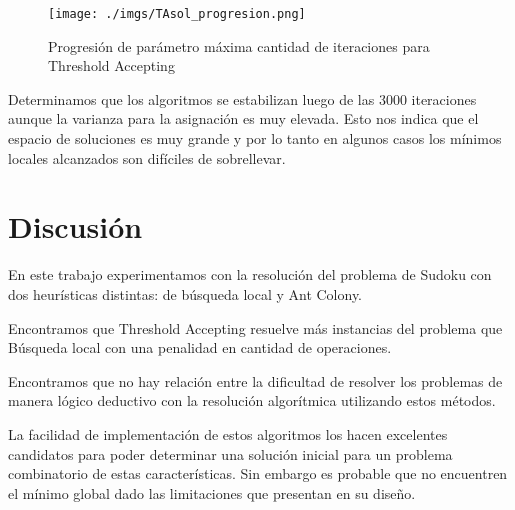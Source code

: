 \documentclass[a4paper,spanish]{article}
\begin{document}
\begin{center}
    \begin{figure}[H]
        \texttt{[image: ./imgs/TAsol\_progresion.png]}
        \caption{Progresión de parámetro máxima cantidad de iteraciones para
        Threshold Accepting}
        \label{img:prog_ta}
    \end{figure}
\end{center}

Determinamos que los algoritmos se estabilizan luego de las 3000 iteraciones
aunque la varianza para la asignación es muy elevada. Esto nos indica que el
espacio de soluciones es muy grande y por lo tanto en algunos casos los mínimos locales
alcanzados son difíciles de sobrellevar.



\section{Discusión}

En este trabajo experimentamos con la resolución del problema de Sudoku con dos
heurísticas distintas: de búsqueda local y Ant Colony.

Encontramos que Threshold Accepting resuelve más instancias del problema que
Búsqueda local con una penalidad en cantidad de operaciones.

Encontramos que no hay relación entre la dificultad de resolver los problemas de
manera lógico deductivo con la resolución algorítmica utilizando estos métodos.

La facilidad de implementación de estos algoritmos los hacen excelentes
candidatos para poder determinar una solución inicial para un problema
combinatorio de estas características. Sin embargo es probable que no encuentren
el mínimo global dado las limitaciones que presentan en su diseño.

\clearpage


\end{document}
